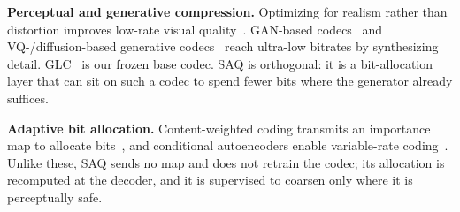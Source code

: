 \documentclass[conference]{IEEEtran}
\begin{document}
\textbf{Perceptual and generative compression.}
Optimizing for realism rather than distortion improves low-rate visual
quality~\cite{blau2019rethinking}. GAN-based
codecs~\cite{agustsson2019extreme,mentzer2020hific,muckley2023improving} and
VQ-/diffusion-based generative
codecs~\cite{jia2024generative,qi2025generative,yang2023lossy,careil2024towards}
reach ultra-low bitrates by synthesizing detail. GLC~\cite{jia2024generative} is
our frozen base codec. SAQ is orthogonal: it is a bit-allocation layer that can
sit on such a codec to spend fewer bits where the generator already suffices.

\textbf{Adaptive bit allocation.}
Content-weighted coding transmits an importance map to allocate
bits~\cite{li2018contentweighted}, and conditional autoencoders enable
variable-rate coding~\cite{choi2019variable}. Unlike these, SAQ sends no map and
does not retrain the codec; its allocation is recomputed at the decoder, and it is
supervised to coarsen only where it is perceptually safe.
\end{document}
